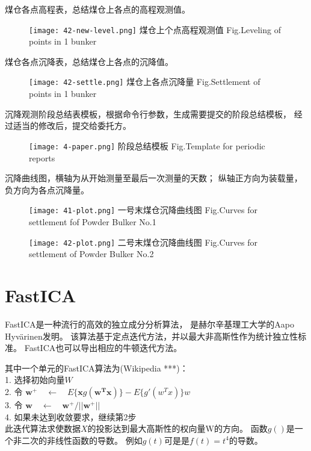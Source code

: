\newpage
煤仓各点高程表，总结煤仓上各点的高程观测值。
\begin{figure}[!htbp]
   \centering
   \texttt{[image: 42-new-level.png]}
					{煤仓上个点高程观测值}
			{Fig.}{Leveling of points in 1 bunker}
\end{figure}

煤仓各点沉降表，总结煤仓上各点的沉降值。
\begin{figure}[!htbp]
   \centering
   \texttt{[image: 42-settle.png]}
					{煤仓上各点沉降量}
			{Fig.}{Settlement of points in 1 bunker}
\end{figure}
\newpage

沉降观测阶段总结表模板，根据命令行参数，生成需要提交的阶段总结模板，
经过适当的修改后，提交给委托方。
\begin{figure}[!htbp]
   \centering
   \texttt{[image: 4-paper.png]}
				    {阶段总结模板}
			{Fig.}{Template for periodic reports}
\end{figure}

沉降曲线图，横轴为从开始测量至最后一次测量的天数；
纵轴正方向为装载量，负方向为各点沉降量。
\begin{figure}[!htbp]
   \centering
   \texttt{[image: 41-plot.png]}
				    {一号末煤仓沉降曲线图}
			{Fig.}{Curves for settlement fof Powder Bulker No.1}
\end{figure}

\begin{figure}[!htbp]
   \centering
   \texttt{[image: 42-plot.png]}
				    {二号末煤仓沉降曲线图}
			{Fig.}{Curves for settlement of Powder Bulker No.2}
\end{figure}

\section{FastICA}
FastICA是一种流行的高效的独立成分分析算法，
是赫尔辛基理工大学的Aapo Hyvärinen发明。
该算法基于定点迭代方法，并以最大非高斯性作为统计独立性标准。
FastICA也可以导出相应的牛顿迭代方法。

其中一个单元的FastICA算法为(Wikipedia ***)：\\
	1. 选择初始向量$W$ \\
	2. 令 $\bm{w}^{+} \quad \leftarrow 
			\quad E\{\bm{x}g(\bm{w^Tx})\} - E\{g'(w^Tx)\}w$ \\
	3. 令 $\bm{w} \quad \leftarrow \quad 
			\bm{w}^{+}/||\bm{w}^{+}||$ \\
	4. 如果未达到收敛要求，继续第2步 \\
此迭代算法求使数据$X$的投影达到最大高斯性的权向量W的方向。
函数$g()$是一个非二次的非线性函数的导数。
例如$g(t)$可是是$f(t)=t^4$的导数。

